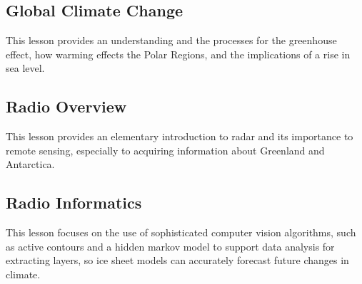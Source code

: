 
\subsection{Global Climate Change}

This lesson provides an understanding and the processes for the
greenhouse effect, how warming effects the Polar Regions, and the
implications of a rise in sea level.


\subsection{Radio Overview}

This lesson provides an elementary introduction to radar and its
importance to remote sensing, especially to acquiring information about
Greenland and Antarctica.


\subsection{Radio Informatics}

This lesson focuses on the use of sophisticated computer vision
algorithms, such as active contours and a hidden markov model to support
data analysis for extracting layers, so ice sheet models can accurately
forecast future changes in climate.

